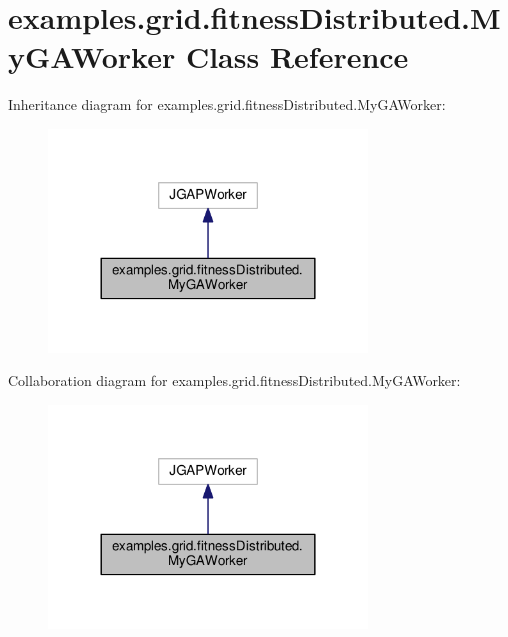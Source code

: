 \hypertarget{classexamples_1_1grid_1_1fitness_distributed_1_1_my_g_a_worker}{\section{examples.\-grid.\-fitness\-Distributed.\-My\-G\-A\-Worker Class Reference}
\label{classexamples_1_1grid_1_1fitness_distributed_1_1_my_g_a_worker}
}


Inheritance diagram for examples.\-grid.\-fitness\-Distributed.\-My\-G\-A\-Worker\-:
\nopagebreak
\begin{figure}[H]
\begin{center}
\leavevmode
\includegraphics[width=240pt]{classexamples_1_1grid_1_1fitness_distributed_1_1_my_g_a_worker__inherit__graph}
\end{center}
\end{figure}


Collaboration diagram for examples.\-grid.\-fitness\-Distributed.\-My\-G\-A\-Worker\-:
\nopagebreak
\begin{figure}[H]
\begin{center}
\leavevmode
\includegraphics[width=240pt]{classexamples_1_1grid_1_1fitness_distributed_1_1_my_g_a_worker__coll__graph}
\end{center}
\end{figure}
